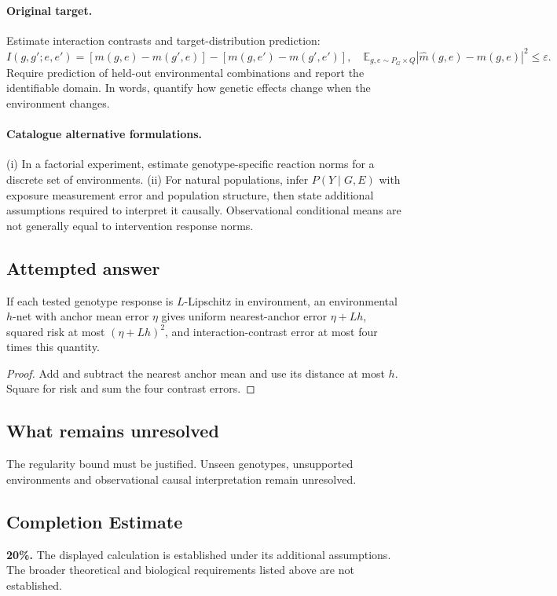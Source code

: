 \documentclass[11pt]{article}
\begin{document}
\paragraph{Original target.}
Estimate interaction contrasts and target-distribution prediction:
\[
I(g,g';e,e')=[m(g,e)-m(g',e)]-[m(g,e')-m(g',e')],
\quad \mathbb{E}_{g,e\sim P_G\times Q}|\widehat m(g,e)-m(g,e)|^2\leq\varepsilon.
\]
Require prediction of held-out environmental combinations and report the identifiable domain. In words, quantify how genetic effects change when the environment changes.
\paragraph{Catalogue alternative formulations.}
(i) In a factorial experiment, estimate genotype-specific reaction norms for a discrete set of environments. (ii) For natural populations, infer $P(Y\mid G,E)$ with exposure measurement error and population structure, then state additional assumptions required to interpret it causally. Observational conditional means are not generally equal to intervention response norms.
\subsection{Attempted answer}
\begin{proposition}
If each tested genotype response is $L$-Lipschitz in environment, an environmental $h$-net with anchor mean error $\eta$ gives uniform nearest-anchor error $\eta+Lh$, squared risk at most $(\eta+Lh)^2$, and interaction-contrast error at most four times this quantity.
\end{proposition}
\begin{proof}
Add and subtract the nearest anchor mean and use its distance at most $h$. Square for risk and sum the four contrast errors.
\end{proof}
\subsection{What remains unresolved}
The regularity bound must be justified. Unseen genotypes, unsupported environments and observational causal interpretation remain unresolved.
\subsection{Completion Estimate}
\textbf{20\%.} The displayed calculation is established under its additional assumptions. The broader theoretical and biological requirements listed above are not established.
\end{document}
